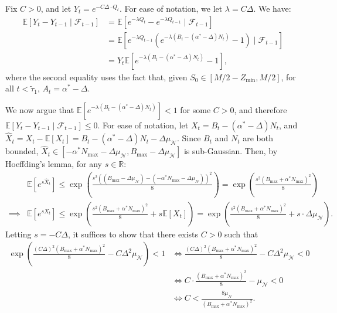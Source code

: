 \documentclass[mnsc,nonblindrev]{informs3}
\newcommand{\E}{\mathbb{E}}
\newcommand{\NDist}{\mathcal{N}}
\newcommand{\Ttaulow}{\widetilde{\tau}_1}
\renewenvironment{proof}[1][Proof]{%
  \par\noindent{\itshape #1.} \ignorespaces
}{%
  \hfill\Halmos\par
}
\begin{document}
\begin{APPENDICES}
\MeanNonZeroMartingale*
\begin{proof}
Fix $C > 0$, and let $Y_t = e^{-C \Delta \cdot Q_t}$. For ease of notation, we let $\lambda = C \Delta$. We have:
    \begin{align*}
    \E[Y_t-Y_{t-1} \mid \mathcal{F}_{t-1}] &= \E\left[e^{-\lambda Q_t}-e^{-\lambda Q_{t-1}} \mid \mathcal{F}_{t-1}\right] \\
    &= \E\left[e^{-\lambda Q_{t-1}}\left(e^{-\lambda \left(B_t-\left(\alpha^*-\Delta\right)N_t\right)}-1\right) \mid \mathcal{F}_{t-1}\right]\\
    &= Y_t\E\left[e^{-\lambda \left(B_t-\left(\alpha^*-\Delta\right)N_t\right)}-1\right],
    \end{align*}
    where the second equality uses the fact that, given $S_0 \in [M/2-Z_{\min}, M/2]$, for all $t < \Ttaulow$, $A_t = \alpha^*-\Delta$.

    We now argue that $\E[e^{-\lambda \left(B_t-\left(\alpha^*-\Delta\right)N_t\right)}] < 1$ for some $C > 0$, and therefore $\E[Y_t-Y_{t-1} \mid \mathcal{F}_{t-1}] \leq 0$. For ease of notation, let $X_t = B_t-\left(\alpha^*-\Delta\right)N_t$, and $\hat{X}_t = X_t-\E[X_t] = B_t-\left(\alpha^*-\Delta\right)N_t-\Delta\mu_{\NDist}$. Since $B_t$ and $N_t$ are both bounded, $\hat{X}_t \in \left[-\alpha^*N_{\max}-\Delta\mu_{\NDist},B_{\max}-\Delta\mu_{\NDist}\right]$ is sub-Gaussian. Then, by Hoeffding's lemma, for any $s \in \mathbb{R}$:
    \begin{align*}
    &\E[e^{s\hat{X}_t}] \leq \exp\left(\frac{s^2\left(\left(B_{\max}-\Delta\mu_{\NDist}\right)-\left(-\alpha^*N_{\max}-\Delta\mu_{\NDist}\right)\right)^2}{8}\right)=\exp\left(\frac{s^2\left(B_{\max}+\alpha^*N_{\max}\right)^2}{8}\right)\\
    \implies &\E[e^{sX_t}] \leq \exp\left(\frac{s^2\left(B_{\max}+\alpha^*N_{\max}\right)^2}{8}+s\E[X_t]\right) = \exp\left(\frac{s^2\left(B_{\max}+\alpha^*N_{\max}\right)^2}{8}+s\cdot \Delta\mu_{\NDist}\right).
    \end{align*}
    Letting $s = -C\Delta$, it suffices to show that there exists $C > 0$ such that 
    \begin{align*}
\exp\left(\frac{(C\Delta)^2\left(B_{\max}+\alpha^*N_{\max}\right)^2}{8}-C\Delta^2\mu_{\NDist}\right) < 1 
&\iff \frac{(C\Delta)^2\left(B_{\max}+\alpha^*N_{\max}\right)^2}{8}-C\Delta^2\mu_{\NDist} < 0 \\
&\iff C\cdot \frac{\left(B_{\max}+\alpha^*N_{\max}\right)^2}{8}-\mu_{\NDist} < 0 \\
&\iff C < \frac{8\mu_{\NDist}}{\left(B_{\max}+\alpha^*N_{\max}\right)^2}.
    \end{align*}


\end{proof}
\end{APPENDICES}
\end{document}
